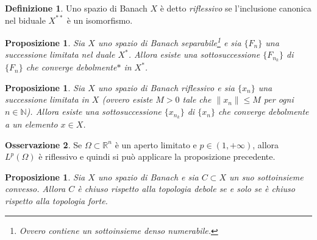 \documentclass[a4paper,11pt]{book}
\theoremstyle{plain}
\newtheorem{prop}[teo]{Proposizione}
\theoremstyle{definition}
\newtheorem{defn}{Definizione}[chapter]
\newtheorem{oss}[defn]{Osservazione}
\theoremstyle{remark}
\newcommand{\R}{\mathbb{R}}
\newcommand{\N}{\mathbb{N}}
\newcommand{\norm}[1]{\lVert#1\rVert}
\begin{document}
\begin{defn}
	Uno spazio di Banach $X$ è detto \textit{riflessivo} se l'inclusione canonica nel biduale $X^{**}$ è un isomorfismo.
\end{defn}


\begin{prop}
	Sia $X$ uno spazio di Banach separabile\footnote{Ovvero contiene un sottoinsieme denso numerabile.} e sia $\{F_{n}\}$ una successione limitata nel duale $X^{*}$. Allora esiste una sottosuccessione $\{F_{n_{k}}\}$ di $\{F_{n}\}$ che converge debolmente$*$ in $X^{*}$.
\end{prop}
\begin{prop}\label{prop:5}
	Sia $X$ uno spazio di Banach riflessivo e sia $\{x_{n}\}$ una successione limitata in $X$ (ovvero esiste $M>0$ tale che $\norm{x_{n}}\leq M$ per ogni $n\in\N$). Allora esiste una sottosuccessione $\{x_{n_{k}}\}$ di $\{x_{n}\}$ che converge debolmente a un elemento $x\in X$.
\end{prop}

\begin{oss}
	Se $\Omega\subset\R^{n}$ è un aperto limitato e $p\in(1,+\infty)$, allora $L^{p}(\Omega)$ è riflessivo e quindi si può applicare la proposizione precedente.
\end{oss}
\begin{prop}\label{prop:9}
	Sia $X$ uno spazio di Banach e sia $C\subset X$ un suo sottoinsieme convesso. Allora $C$ è chiuso rispetto alla topologia debole se e solo se è chiuso rispetto alla topologia forte.
\end{prop}


\end{document}
